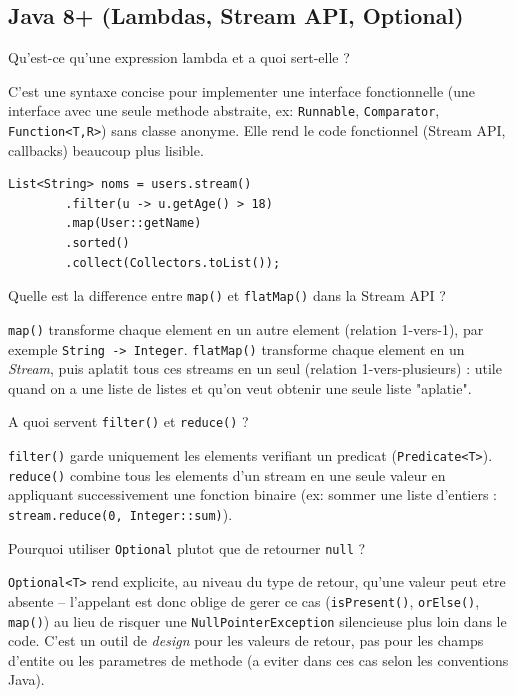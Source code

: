 \documentclass[11pt,a4paper]{article}
\begin{document}
\subsection{Java 8+ (Lambdas, Stream API, Optional)}

\begin{question} Qu'est-ce qu'une expression lambda et a quoi sert-elle ?
\end{question}
\begin{reponse}
C'est une syntaxe concise pour implementer une interface fonctionnelle (une interface avec une seule methode abstraite, ex: \texttt{Runnable}, \texttt{Comparator}, \texttt{Function<T,R>}) sans classe anonyme. Elle rend le code fonctionnel (Stream API, callbacks) beaucoup plus lisible.
\end{reponse}

\begin{lstlisting}
List<String> noms = users.stream()
        .filter(u -> u.getAge() > 18)
        .map(User::getName)
        .sorted()
        .collect(Collectors.toList());
\end{lstlisting}

\begin{question} Quelle est la difference entre \texttt{map()} et \texttt{flatMap()} dans la Stream API ?
\end{question}
\begin{reponse}
\texttt{map()} transforme chaque element en un autre element (relation 1-vers-1), par exemple \texttt{String -> Integer}. \texttt{flatMap()} transforme chaque element en un \emph{Stream}, puis aplatit tous ces streams en un seul (relation 1-vers-plusieurs) : utile quand on a une liste de listes et qu'on veut obtenir une seule liste "aplatie".
\end{reponse}

\begin{question} A quoi servent \texttt{filter()} et \texttt{reduce()} ?
\end{question}
\begin{reponse}
\texttt{filter()} garde uniquement les elements verifiant un predicat (\texttt{Predicate<T>}). \texttt{reduce()} combine tous les elements d'un stream en une seule valeur en appliquant successivement une fonction binaire (ex: sommer une liste d'entiers : \texttt{stream.reduce(0, Integer::sum)}).
\end{reponse}

\begin{question} Pourquoi utiliser \texttt{Optional} plutot que de retourner \texttt{null} ?
\end{question}
\begin{reponse}
\texttt{Optional<T>} rend explicite, au niveau du type de retour, qu'une valeur peut etre absente -- l'appelant est donc oblige de gerer ce cas (\texttt{isPresent()}, \texttt{orElse()}, \texttt{map()}) au lieu de risquer une \texttt{NullPointerException} silencieuse plus loin dans le code. C'est un outil de \emph{design} pour les valeurs de retour, pas pour les champs d'entite ou les parametres de methode (a eviter dans ces cas selon les conventions Java).
\end{reponse}
\end{document}
